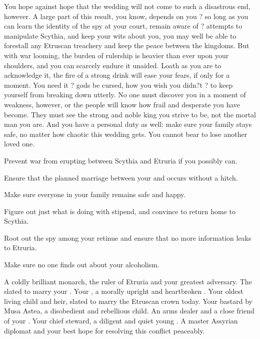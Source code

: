 \documentclass[char]{Kos}
\begin{document}
    You hope against hope that the wedding will not come to such a disastrous end, however. A large part of this result, you know, depends on you ? so long as you can learn the identity of the spy at your court, remain aware of \EtruriaKing{}? attempts to manipulate Scythia, and keep your wits about you, you may well be able to forestall any Etruscan treachery and keep the peace between the kingdoms. But with war looming, the burden of rulership is heavier than ever upon your shoulders, and you can scarcely endure it unaided. Loath as you are to acknowledge it, the fire of a strong drink will ease your fears, if only for a moment. You need it ? gods be cursed, how you wish you didn?t ? to keep yourself from breaking down utterly. No one must discover you in a moment of weakness, however, or the people will know how frail and desperate you have become. They must see the strong and noble king you strive to be, not the mortal man you are. And you have a personal duty as well: make sure your family stays safe, no matter how chaotic this wedding gets. You cannot bear to lose another loved one.

\begin{itemz}[Goals]
\item Prevent war from erupting between Scythia and Etruria if you possibly can.
\item Ensure that the planned marriage between your \cBride{\offspring} and \cGroom{} occurs without a hitch.
\item Make sure everyone in your family remains safe and happy.
\item Figure out just what \cWard{} is doing with \cWard{\their} stipend, and convince \cWard{\them} to return home to Scythia.
\item Root out the spy among your retinue and ensure that no more information leaks to Etruria.
\item Make sure no one finds out about your alcoholism.
\end{itemz}

\begin{contacts}
\contact{\cEtruriaKing{}} A coldly brilliant monarch, the ruler of Etruria and your greatest adversary.
\contact{\cGroom{}} The \cGroom{\human} slated to marry your \cBride{\offspring}.
\contact{\cScythiaQueen{}} Your \cScythiaQueen{\spouse}, a morally upright and heartbroken \cScythiaQueen{\person}.
\contact{\cBride{}} Your oldest living child and heir, slated to marry the Etruscan crown  today.
\contact{\cWard{}} Your bastard \cWard{\offspring} by Musa Astea, a disobedient and rebellious child.
\contact{\cArmsDealer{}} An arms dealer and a close friend of your \cScythiaQueen{\spouse}.
\contact{\cButler{}} Your chief steward, a diligent and quiet young \cButler{\human}.
 A master Assyrian diplomat and your best hope for resolving this conflict peaceably.
\end{contacts}
\end{document}
